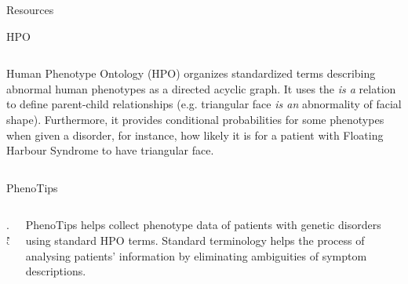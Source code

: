 \documentclass[final]{beamer} %
\begin{document}
\begin{frame}{}
\begin{columns}[T]
\begin{column}{0.3\linewidth}
\begin{block}{\Huge Resources}
\begin{block}{\Large HPO}
\begin{columns}[T]
     \begin{column}{.5\textwidth}
      \Large
      Human Phenotype Ontology (HPO) organizes standardized terms describing abnormal human phenotypes as a directed acyclic graph. It uses the  {\it{\Large is a}} relation to define parent-child relationships (e.g. triangular face {\it{\Large is an}} abnormality of facial shape). Furthermore, it provides conditional probabilities for some phenotypes when given a disorder, for instance, how likely it is for a patient with Floating Harbour Syndrome to have triangular face. 
     \end{column}
   \end{columns}
  \end{block}
  

   \begin{block}{\Large PhenoTips}
      \begin{columns}[T]
        \begin{column} {.5\textwidth}
           \vspace{4cm}
           \centering
        \end{column}
        
        \begin{column}{.5\textwidth}
          \Large
          PhenoTips helps collect phenotype data of patients with genetic disorders using standard HPO terms. Standard terminology helps the process of analysing patients' information by eliminating ambiguities of symptom descriptions.
        \end{column}
      \end{columns}
    \end{block}

   \end{block}


\end{column}
\end{columns}
\end{frame}
\end{document}

